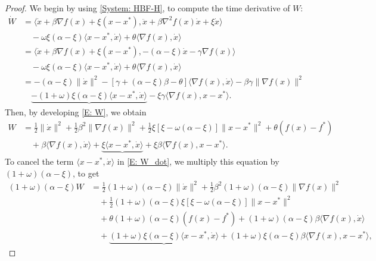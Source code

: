 \documentclass[pdflatex,sn-mathphys-num]{sn-jnl}
\theoremstyle{thmstyleone}
\theoremstyle{thmstyletwo}
\theoremstyle{thmstylethree}
\begin{document}
\begin{appendices}
\begin{proof}
We begin by using \eqref{System: HBF-H}, to compute the time derivative of $W$:
\begin{equation}\label{E: W_dot}
\begin{aligned}
\dot{W} 
&= \big\langle \dot{x} + \beta\nabla f(x) + \xi(x-x^*), \ddot{x} + \beta\nabla^2 f(x) \dot{x} + \xi\dot{x} \big\rangle \\ 
&\quad - \omega\xi(\alpha-\xi)\langle x-x^*, \dot{x} \rangle 
  + \theta \langle \nabla f(x), \dot{x} \rangle \\
&= \big\langle \dot{x} + \beta\nabla f(x) + \xi(x-x^*), -(\alpha-\xi)\dot{x} - \gamma\nabla f(x) \big\rangle \\
&\quad - \omega\xi(\alpha-\xi)\langle x-x^*, \dot{x} \rangle
  + \theta \langle \nabla f(x), \dot{x} \rangle \\
&= -(\alpha-\xi)\|\dot{x}\|^2 
   - [\gamma + (\alpha-\xi)\beta - \theta]\langle \nabla f(x),\dot{x} \rangle
   - \beta\gamma\|\nabla f(x)\|^2 \\
&\quad \underbrace{ - (1+\omega)\xi(\alpha-\xi) \langle x-x^*,\dot{x} \rangle }
   - \xi\gamma\langle\nabla f(x),x-x^* \rangle.
\end{aligned}
\end{equation}
Then, by developing \eqref{E: W}, we obtain
\begin{align*}
W 
&= \frac{1}{2}\|\dot{x}\|^2 
  + \frac{1}{2}\beta^2\|\nabla f(x) \|^2 
  + \frac{1}{2}\xi[\xi-\omega(\alpha-\xi)]\|x-x^*\|^2
  + \theta(f(x)-f^*) \\
&\quad + \beta\langle \nabla f(x),\dot{x} \rangle
  + \underbrace{ \xi\langle x-x^*,\dot{x} \rangle }
  + \xi\beta\langle \nabla f(x),x-x^*\rangle.
\end{align*}
To cancel the term $\langle x-x^*,\dot{x} \rangle$ in \eqref{E: W_dot}, we multiply this equation by $(1+\omega)(\alpha-\xi)$, to get
\begin{align*}
(1+\omega)(\alpha-\xi)W 
&= \frac{1}{2}(1+\omega)(\alpha-\xi)\|\dot{x}\|^2 
  + \frac{1}{2}\beta^2(1+\omega)(\alpha-\xi) \|\nabla f(x) \|^2 \\
&\quad + \frac{1}{2}(1+\omega)(\alpha-\xi)\xi[\xi-\omega(\alpha-\xi)]\|x-x^*\|^2 \\
&\quad + \theta(1+\omega)(\alpha-\xi)(f(x)-f^*) 
  + (1+\omega)(\alpha-\xi)\beta\langle \nabla f(x),\dot{x} \rangle \\
&\quad + \underbrace{ (1+\omega)\xi(\alpha-\xi)\langle x-x^*,\dot{x} \rangle }
  + (1+\omega)\xi(\alpha-\xi)\beta\langle \nabla f(x),x-x^*\rangle,

\end{align*}
\end{proof}
\end{appendices}
\end{document}
